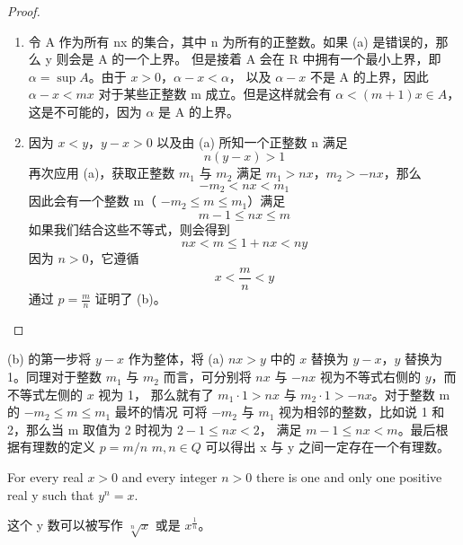 \documentclass[../poma-note.tex]{subfiles}
\begin{document}
\begin{proof}
	\begin{enumerate}[label=(\alph*)]
		\item 令 A 作为所有 nx 的集合，其中 n 为所有的正整数。如果 (a) 是错误的，那么 y 则会是 A 的一个上界。
		      但是接着 A 会在 R 中拥有一个最小上界，即 $\alpha  = \sup A$。由于 $x>0$，$\alpha - x < \alpha$，
		      以及 $\alpha - x$ 不是 A 的上界，因此 $\alpha - x < mx$ 对于某些正整数 m 成立。但是这样就会有
		      $\alpha < (m+1)x \in A$，这是不可能的，因为 $\alpha$ 是 A 的上界。
		\item 因为 $x<y$，$y-x>0$ 以及由 (a) 所知一个正整数 n 满足
		      \[n(y-x)>1\]
		      再次应用 (a)，获取正整数 $m_1$ 与 $m_2$ 满足 $m_1 > nx$，$m_2 > -nx$，那么
		      \[-m_2 < nx < m_1\]
		      因此会有一个整数 m（ $-m_2 \le m \le m_1$）满足
		      \[m-1 \le nx \le m\]
		      如果我们结合这些不等式，则会得到
		      \[nx < m \le 1 + nx < ny\]
		      因为 $n>0$，它遵循
		      \[x < \frac{m}{n} < y\]
		      通过 $p=\frac{m}{n}$ 证明了 (b)。
	\end{enumerate}
\end{proof}

\anote
(b) 的第一步将 $y-x$ 作为整体，将 (a) $nx > y$ 中的 $x$ 替换为 $y-x$，$y$ 替换为 1。同理对于整数
$m_1$ 与 $m_2$ 而言，可分别将 $nx$ 与 $-nx$ 视为不等式右侧的 $y$，而不等式左侧的 $x$ 视为 1，
那么就有了 $m_1 \cdot 1 > nx$ 与 $m_2 \cdot 1 > -nx$。对于整数 m 的 $-m_2 \le m \le m_1$ 最坏的情况
可将 $-m_2$ 与 $m_1$ 视为相邻的整数，比如说 1 和 2，那么当 m 取值为 2 时视为 $2 - 1 \le nx < 2$，
满足 $m - 1 \le nx < m$。最后根据有理数的定义 $p=m/n$ $m,n \in Q$ 可以得出 x 与 y 之间一定存在一个有理数。

\begin{theorem}
	For every real $x>0$ and every integer $n>0$ there is one and only one positive real y such that
	$y^n=x$.
\end{theorem}

这个 y 数可以被写作 $\sqrt[n]{x}$ 或是 $x^\frac{1}{n}$。
\end{document}
